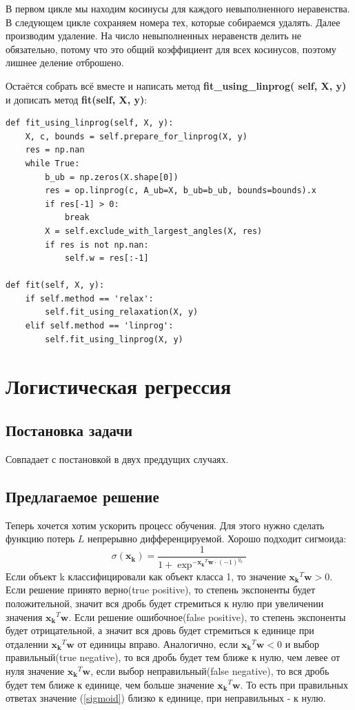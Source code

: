 \documentclass[a4paper]{article}
\newcommand{\w}{\bm{w}}
\newcommand{\yk}{y_k}
\newcommand{\xk}{\bm{x_k}}
\begin{document}
В первом цикле мы находим косинусы для каждого невыполненного неравенства. В следующем цикле сохраняем номера тех, которые собираемся удалять. Далее производим удаление. На число невыполненных неравенств делить не обязательно, потому что это общий коэффициент для всех косинусов, поэтому лишнее деление отброшено.

Остаётся собрать всё вместе и написать метод \textbf{fit\_using\_linprog( self, X, y)} и дописать метод \textbf{fit(self, X, y)}:
\begin{lstlisting}
def fit_using_linprog(self, X, y):
	X, c, bounds = self.prepare_for_linprog(X, y)
	res = np.nan
	while True:
		b_ub = np.zeros(X.shape[0])
		res = op.linprog(c, A_ub=X, b_ub=b_ub, bounds=bounds).x
		if res[-1] > 0:
			break
		X = self.exclude_with_largest_angles(X, res)
		if res is not np.nan:
			self.w = res[:-1]
            
def fit(self, X, y):
	if self.method == 'relax':
		self.fit_using_relaxation(X, y)
	elif self.method == 'linprog':
		self.fit_using_linprog(X, y)
\end{lstlisting}

\section{Логистическая регрессия}
\subsection{Постановка задачи}
Совпадает с постановкой в двух преддущих случаях.
\subsection{Предлагаемое решение}
Теперь хочется хотим ускорить процесс обучения. Для этого нужно сделать функцию потерь $L$ непрерывно дифференцируемой. Хорошо подходит сигмоида:
\begin{equation} \label{sigmoid}
\sigma(\xk) = \frac{1}{1 + \exp^{ - \xk^T\w \cdot (-1)^{\yk}}}
\end{equation}
Если объект k классифицировали как объект класса 1, то значение $\xk^T\w > 0$. Если решение принято верно(true positive), то степень экспоненты будет положительной, значит вся дробь будет стремиться к нулю при увеличении значения $\xk^T\w$. Если решение ошибочное(false positive), то степень экспоненты будет отрицательной, а значит вся дровь будет стремиться к единице при отдалении $\xk^T\w$ от единицы вправо. Аналогично, если $\xk^T\w < 0$ и выбор правильный(true negative), то вся дробь будет тем ближе к нулю, чем левее от нуля значение $\xk^T\w$, если выбор неправильный(false negative), то вся дробь будет тем ближе к единице, чем больше значение $\xk^T\w$. То есть при правильных ответах значение (\ref{sigmoid}) близко к единице, при неправильных - к нулю.
\end{document}
